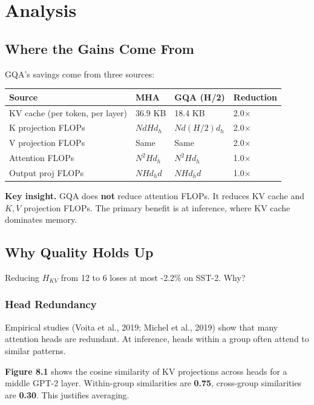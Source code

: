 \section{Analysis}

\subsection{Where the Gains Come From}

GQA's savings come from three sources:

\begin{table}[H]
\centering
\small
\begin{tabular}{llll}
\toprule
\textbf{Source} & \textbf{MHA} & \textbf{GQA (H/2)} & \textbf{Reduction} \\
\midrule
KV cache (per token, per layer) & 36.9 KB & 18.4 KB & 2.0$\times$ \\
K projection FLOPs & $N d H d_h$ & $N d (H/2) d_h$ & 2.0$\times$ \\
V projection FLOPs & Same & Same & 2.0$\times$ \\
Attention FLOPs & $N^2 H d_h$ & $N^2 H d_h$ & 1.0$\times$ \\
Output proj FLOPs & $N H d_h d$ & $N H d_h d$ & 1.0$\times$ \\
\bottomrule
\end{tabular}
\end{table}

\textbf{Key insight.} GQA does \textbf{not} reduce attention FLOPs. It reduces KV 
cache and $K, V$ projection FLOPs. The primary benefit is at inference, 
where KV cache dominates memory.

\subsection{Why Quality Holds Up}

Reducing $H_{KV}$ from 12 to 6 loses at most -2.2\% on SST-2. Why?

\subsubsection{Head Redundancy}

Empirical studies (Voita et al., 2019; Michel et al., 2019) show that many 
attention heads are redundant. At inference, heads within a group often 
attend to similar patterns.

\textbf{Figure 8.1} shows the cosine similarity of KV projections across heads 
for a middle GPT-2 layer. Within-group similarities are 
\textbf{0.75}, cross-group similarities are \textbf{0.30}. This 
justifies averaging.

